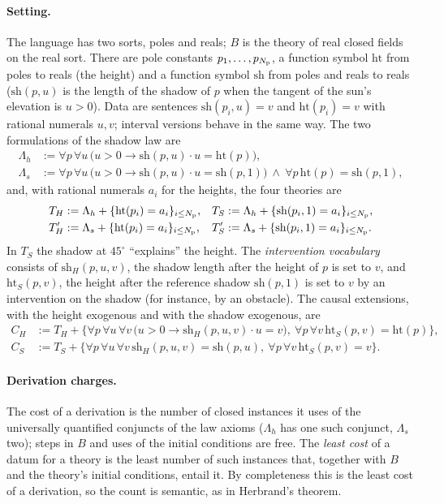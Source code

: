 \paragraph{Setting.} The language has two sorts, poles and reals; $B$ is the theory of real closed fields on the real sort. There are pole constants $p_1,\dots,p_{N_{\rm p}}$, a function symbol $\mathrm{ht}$ from poles to reals (the height) and a function symbol $\mathrm{sh}$ from poles and reals to reals ($\mathrm{sh}(p,u)$ is the length of the shadow of $p$ when the tangent of the sun's elevation is $u>0$). Data are sentences $\mathrm{sh}(p_i,u)=v$ and $\mathrm{ht}(p_i)=v$ with rational numerals $u,v$; interval versions behave in the same way. The two formulations of the shadow law are
\begin{align*}
\Lambda_h&:=\forall p\,\forall u\,\big(u>0\to\mathrm{sh}(p,u)\cdot u=\mathrm{ht}(p)\big),\\
\Lambda_s&:=\forall p\,\forall u\,\big(u>0\to\mathrm{sh}(p,u)\cdot u=\mathrm{sh}(p,1)\big)\ \wedge\ \forall p\,\mathrm{ht}(p)=\mathrm{sh}(p,1),
\end{align*}
and, with rational numerals $a_i$ for the heights, the four theories are
\begin{align*}
T_H&:=\Lambda_h+\{\mathrm{ht}(p_i)=a_i\}_{i\le N_{\rm p}}, & T_S&:=\Lambda_h+\{\mathrm{sh}(p_i,1)=a_i\}_{i\le N_{\rm p}},\\
T'_H&:=\Lambda_s+\{\mathrm{ht}(p_i)=a_i\}_{i\le N_{\rm p}}, & T'_S&:=\Lambda_s+\{\mathrm{sh}(p_i,1)=a_i\}_{i\le N_{\rm p}}.
\end{align*}
In $T_S$ the shadow at $45^\circ$ ``explains'' the height. The \emph{intervention vocabulary} consists of $\mathrm{sh}_H(p,u,v)$, the shadow length after the height of $p$ is set to $v$, and $\mathrm{ht}_S(p,v)$, the height after the reference shadow $\mathrm{sh}(p,1)$ is set to $v$ by an intervention on the shadow (for instance, by an obstacle). The causal extensions, with the height exogenous and with the shadow exogenous, are
\begin{align*}
C_H&:=T_H+\big\{\forall p\,\forall u\,\forall v\,\big(u>0\to\mathrm{sh}_H(p,u,v)\cdot u=v\big),\ \forall p\,\forall v\,\mathrm{ht}_S(p,v)=\mathrm{ht}(p)\big\},\\
C_S&:=T_S+\big\{\forall p\,\forall u\,\forall v\,\mathrm{sh}_H(p,u,v)=\mathrm{sh}(p,u),\ \forall p\,\forall v\,\mathrm{ht}_S(p,v)=v\big\}.
\end{align*}

\paragraph{Derivation charges.} The cost of a derivation is the number of closed instances it uses of the universally quantified conjuncts of the law axioms ($\Lambda_h$ has one such conjunct, $\Lambda_s$ two); steps in $B$ and uses of the initial conditions are free. The \emph{least cost} of a datum for a theory is the least number of such instances that, together with $B$ and the theory's initial conditions, entail it. By completeness this is the least cost of a derivation, so the count is semantic, as in Herbrand's theorem.

